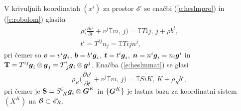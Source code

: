 V krivuljnih koordinatah $(x^i)$ za prostor $\mathscr E$ se enačbi (\ref{e:heslmpro}) in (\ref{e:robolom}) glasita
\begin{gather*}
	\rho\Big(\frac{\partial v^i}{\partial t}+v^j\topbot{v}{i}{,\, j}\Big)=\topbot{T}{ij}{,\, j}+\rho b^i,\\
	t^i=T^{ij}n_j=\topbot{T}{i}{j}n^j,
\end{gather*}
pri čemer so $\boldsymbol v=v^i\boldsymbol g_i$, $\boldsymbol b=b^i\boldsymbol g_i$, $\boldsymbol t=t^i\boldsymbol g_i$,
$\boldsymbol n=n^i\boldsymbol g_i=n_i\boldsymbol g^i$ in $\ten{T}=T^{ij}\vek{g}_i\otimes\vek{g}_j=\topbot{T}{i}{j}\vek{g}_i\otimes\vek{g}^j$.
Enačba (\ref{e:heslmmat}) se glasi
\begin{equation*}
	\rho_R\Big(\frac{\partial v^i}{\partial t}+v^j\topbot{v}{i}{,\, j}\Big)=\topbot{S}{iK}{,\, K}+\rho_R b^i,
\end{equation*}
pri čemer je $\ten{S}=\topbot{S}{i}{K}\vek{g}_i\otimes\vek{G}^K$
in $\{\boldsymbol G^K\}$ je lastna baza za koordinatni sistem $(X^K)$ na $\mathcal B\subset\mathscr E_R$.